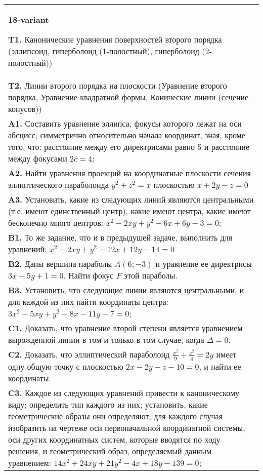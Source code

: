 \documentclass{article}
\begin{document}
\begin{tabular}{m{17cm}}
\textbf{18-variant}
\newline

\textbf{T1.} Канонические уравнения поверхностей второго порядка (эллипсоид, гиперболоид (1-полостный), гиперболоид (2-полостный)) \\
\textbf{T2.} Линии второго порядка на плоскости (Уравнение второго порядка, Уравнение квадратной формы, Конические линии (сечение конусов)) \\
\textbf{A1.} Составить уравнение эллипса, фокусы которого лежат на оси абсцисс, симметрично относительно начала координат, зная, кроме того, что: расстояние между его директрисами равно 5 и расстояние между фокусами $2 c=4$; \\
\textbf{A2.} Найти уравнения проекций на координатные плоскости сечения эллиптического параболоида $y^2+z^2=x$ плоскостью $x+2 y-z=0$ \\
\textbf{A3.} Установить, какие из следующих линий являются центральными (т.е. имеют единственный центр), какие имеют центра, какие имеют бесконечно много центров: $x^2-2 x y+y^2-6 x+6 y-3=0$; \\
\textbf{B1.} То же задание, что и в предыдушей задаче, выполнить для уравнений: $x^2-2 x y+y^2-12 x+12 y-14=0$ \\
\textbf{B2.} Даны вершина параболы $A(6 ;-3)$ и уравнение ее директрисы $3 x-5 y+1=0$. Найти фокус $F$ этой параболы. \\
\textbf{B3.} Установить, что следующие линии являются центральными, и для каждой из них найти координаты центра: $3 x^2+5 x y+y^2-8 x-11 y-7=0$; \\
\textbf{C1.} Доказать, что уравнение второй степени является уравнением вырожденной линии в том и только в том случае, когда $\Delta=0$. \\
\textbf{C2.} Доказать, что эллиптический параболоид $\frac{x^2}{9}+\frac{z^2}{4}=2 y$ имеет одну общую точку с плоскостью $2 x-2 y-z-10=0$, и найти ее координаты. \\
\textbf{C3.} Каждое из следующих уравнений привести к каноническому виду; определить тип каждого из них; установить, какие геометрические образы они определяют; для каждого случая изобразить на чертеже оси первоначальной координатной системы, оси других координатных систем, которые вводятся по ходу решения, и геометрический образ, определяемый данным уравнением: $14 x^2+24 x y+21 y^2-4 x+18 y-139=0$; \\

\end{tabular}
\vspace{1cm}
\end{document}
